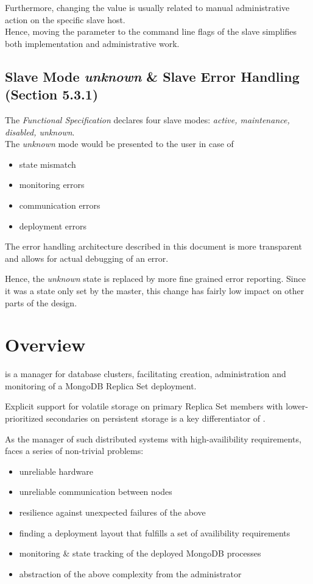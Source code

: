Furthermore, changing the value is usually related to manual administrative action on the specific slave host.\\
Hence, moving the parameter to the command line flags of the slave simplifies both implementation and administrative work.

\subsection{Slave Mode \emph{unknown} \& Slave Error Handling (Section 5.3.1)}

The \emph{Functional Specification} declares four slave modes: \emph{active, maintenance, disabled, unknown}.\\
The \emph{unknown} mode would be presented to the user in case of
\begin{itemize}
  \item state mismatch
  \item monitoring errors
  \item communication errors
  \item deployment errors
\end{itemize}

The error handling architecture described in this document is more transparent and allows for actual debugging of an error.

Hence, the \emph{unknown} state is replaced by more fine grained error reporting.
Since it was a state only set by the master, this change has fairly low impact on other parts of the design.


\section{Overview}

\mamid is a manager for database clusters, facilitating creation, administration and monitoring of a MongoDB Replica Set deployment.

Explicit support for volatile storage on primary Replica Set members with lower-prioritized secondaries on persistent
storage is a key differentiator of \mamid.

As the manager of such distributed systems with high-availibility requirements, \mamid faces a series of non-trivial problems:
\begin{itemize}
  \item unreliable hardware
  \item unreliable communication between nodes
  \item resilience against unexpected failures of the above 
  \item finding a deployment layout that fulfills a set of availibility requirements
  \item monitoring \& state tracking of the deployed MongoDB processes
  \item abstraction of the above complexity from the administrator
\end{itemize}

